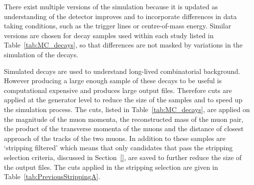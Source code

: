 There exist multiple versions of the simulation because it is updated as understanding of the detector improves and to incorporate differences in data taking conditions, such as the trigger lines or centre-of-mass energy. 
Similar versions are chosen for decay samples used within each study listed in Table~\ref{tab:MC_decays}, so that differences are not masked by variations in the simulation of the decays.




Simulated \bbbarmumux decays are used to understand long-lived combinatorial background. However producing a large enough sample of these decays to be useful is computational expensive and produces large output files. Therefore cuts are applied at the generator level to reduce the size of the samples and to speed up the simulation process. The cuts, listed in Table~\ref{tab:MC_decays}, are applied on the magnitude of the muon momenta, the reconstructed mass of the muon pair, the product of the transverse momenta of the muons and the distance of closest approach of the tracks of the two muons. In addition to these samples are `stripping filtered' which means that only candidates that pass the \bmumu stripping selection criteria, discussed in Section~\ref{}, are saved to further reduce the size of the output files. The cuts applied in the stripping selection are given in Table~\ref{tab:PreviousStrippingA}.%
  

